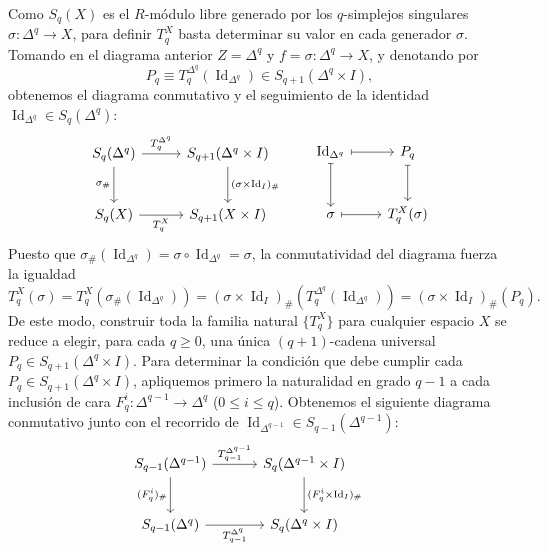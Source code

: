 \begin{dem}
Como $S_q(X)$ es el $R$-módulo libre generado por los $q$-simplejos singulares $\sigma \colon \Delta^q \to X$, para definir $T_q^X$ basta determinar su valor en cada generador $\sigma$. Tomando en el diagrama anterior $Z = \Delta^q$ y $f = \sigma \colon \Delta^q \to X$, y denotando por
\[
P_q \equiv T_q^{\Delta^q}(\operatorname{Id}_{\Delta^q}) \in S_{q+1}(\Delta^q \times I),
\]
obtenemos el diagrama conmutativo y el seguimiento de la identidad $\operatorname{Id}_{\Delta^q} \in S_q(\Delta^q)$:
\[
\begin{tikzcd}[column sep=2.8em, row sep=2.6em]
S_q(\Delta^q) \arrow[r, "T_q^{\Delta^q}"] \arrow[d, "\sigma_\#"'] & S_{q+1}(\Delta^q \times I) \arrow[d, "(\sigma \times \operatorname{Id}_I)_\#"] \\
S_q(X) \arrow[r, "T_q^X"'] & S_{q+1}(X \times I)
\end{tikzcd}
\hspace{2em}
\begin{tikzcd}[column sep=2.2em, row sep=2.6em]
\operatorname{Id}_{\Delta^q} \arrow[r, mapsto] \arrow[d, mapsto] & P_q \arrow[d, mapsto] \\
\sigma \arrow[r, mapsto] & T_q^X(\sigma)
\end{tikzcd}
\]
Puesto que $\sigma_\#(\operatorname{Id}_{\Delta^q}) = \sigma \circ \operatorname{Id}_{\Delta^q} = \sigma$, la conmutatividad del diagrama fuerza la igualdad
\[
{T_q^X(\sigma) = T_q^X(\sigma_\#(\operatorname{Id}_{\Delta^q})) = (\sigma \times \operatorname{Id}_I)_\#(T_q^{\Delta^q}(\operatorname{Id}_{\Delta^q})) = (\sigma \times \operatorname{Id}_I)_\#(P_q).}
\]
De este modo, construir toda la familia natural $\{T_q^X\}$ para cualquier espacio $X$ se reduce a elegir, para cada $q \geq 0$, una única $(q+1)$-cadena universal $P_q \in S_{q+1}(\Delta^q \times I)$.
Para determinar la condición que debe cumplir cada $P_q \in S_{q+1}(\Delta^q \times I)$, apliquemos primero la naturalidad en grado $q-1$ a cada inclusión de cara $F_q^i \colon \Delta^{q-1} \to \Delta^q$ ($0 \leq i \leq q$). Obtenemos el siguiente diagrama conmutativo junto con el recorrido de $\operatorname{Id}_{\Delta^{q-1}} \in S_{q-1}(\Delta^{q-1})$:
\[
\begin{tikzcd}[column sep=3.2em, row sep=2.6em]
S_{q-1}(\Delta^{q-1}) \arrow[r, "T_{q-1}^{\Delta^{q-1}}"] \arrow[d, "(F_q^i)_\#"'] & S_q(\Delta^{q-1} \times I) \arrow[d, "(F_q^i \times \operatorname{Id}_I)_\#"] \\
S_{q-1}(\Delta^q) \arrow[r, "T_{q-1}^{\Delta^q}"'] & S_q(\Delta^q \times I)
\end{tikzcd}
\hspace{1.8em}
\]
\end{dem}
